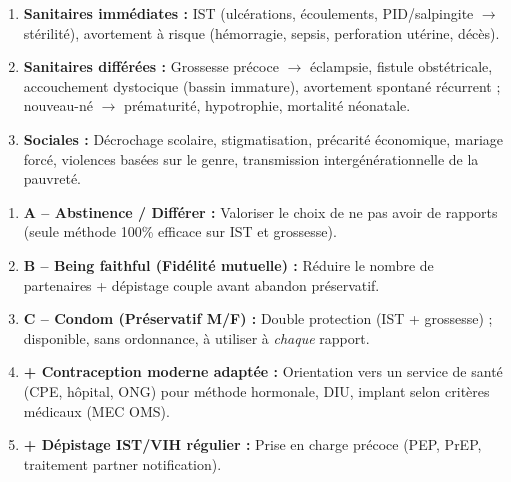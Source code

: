 \documentclass[11pt]{article}
\begin{document}
\begin{bilan}
\begin{methode}
  \begin{enumerate}
    \item \textbf{Sanitaires immédiates :} IST (ulcérations, écoulements, PID/salpingite $\rightarrow$ stérilité), avortement à risque (hémorragie, sepsis, perforation utérine, décès).
    \item \textbf{Sanitaires différées :} Grossesse précoce $\rightarrow$ éclampsie, fistule obstétricale, accouchement dystocique (bassin immature), avortement spontané récurrent ; nouveau-né $\rightarrow$ prématurité, hypotrophie, mortalité néonatale.
    \item \textbf{Sociales :} Décrochage scolaire, stigmatisation, précarité économique, mariage forcé, violences basées sur le genre, transmission intergénérationnelle de la pauvreté.
  \end{enumerate}
\end{methode}

\begin{methode}
  \begin{enumerate}
    \item \textbf{A -- Abstinence / Différer :} Valoriser le choix de ne pas avoir de rapports (seule méthode 100\% efficace sur IST et grossesse).
    \item \textbf{B -- Being faithful (Fidélité mutuelle) :} Réduire le nombre de partenaires + dépistage couple avant abandon préservatif.
    \item \textbf{C -- Condom (Préservatif M/F) :} Double protection (IST + grossesse) ; disponible, sans ordonnance, à utiliser à \emph{chaque} rapport.
    \item \textbf{+ Contraception moderne adaptée :} Orientation vers un service de santé (CPE, hôpital, ONG) pour méthode hormonale, DIU, implant selon critères médicaux (MEC OMS).
    \item \textbf{+ Dépistage IST/VIH régulier :} Prise en charge précoce (PEP, PrEP, traitement partner notification).
  \end{enumerate}
\end{methode}

\end{bilan}
\end{document}
